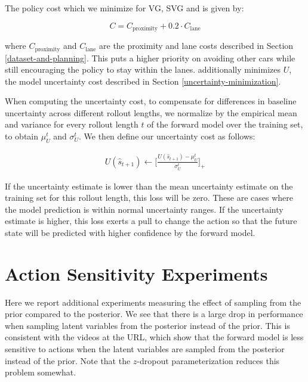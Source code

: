 \documentclass{article} %
\begin{document}
        The policy cost which we minimize for VG, SVG and \modelnamedrop is given by:

    \begin{equation}
      C = C_{\text{proximity}} + 0.2 \cdot C_\text{lane}
    \end{equation}

    where $C_{\text{proximity}}$ and $C_\text{lane}$ are the proximity and lane costs described in Section \ref{dataset-and-planning}. This puts a higher priority on avoiding other cars while still encouraging the policy to stay within the lanes. \modelnamedrop additionally minimizes $U$, the model uncertainty cost described in Section \ref{uncertainty-minimization}.



    When computing the uncertainty cost, to compensate for differences in baseline uncertainty across different rollout lengths, we normalize by the empirical mean and variance for every rollout length $t$ of the forward model over the training set, to obtain $\mu_{U}^t$ and $\sigma_{U}^t$. We then define our uncertainty cost as follows:

    \begin{align}
      U(\hat{s}_{t+1}) \leftarrow \Big [ \frac{U(\hat{s}_{t+1}) - \mu_U^t}{\sigma_U^t} \Big]_+
    \end{align}

    If the uncertainty estimate is lower than the mean uncertainty estimate on the training set for this rollout length, this loss will be zero.
    These are cases where the model prediction is within normal uncertainty ranges. If the uncertainty estimate is higher, this loss exerts a pull to change the action so that the future state will be predicted with higher confidence by the forward model.
    
    



    \section{Action Sensitivity Experiments}
    \label{action-sensitivity-appendix}

    Here we report additional experiments measuring the effect of sampling from the prior compared to the posterior.
    We see that there is a large drop in performance when sampling latent variables from the posterior instead of the prior.
    This is consistent with the videos at the URL, which show that the forward model is less sensitive to actions when the latent variables are sampled from the posterior instead of the prior. Note that the $z$-dropout parameterization reduces this problem somewhat. 
\end{document}
